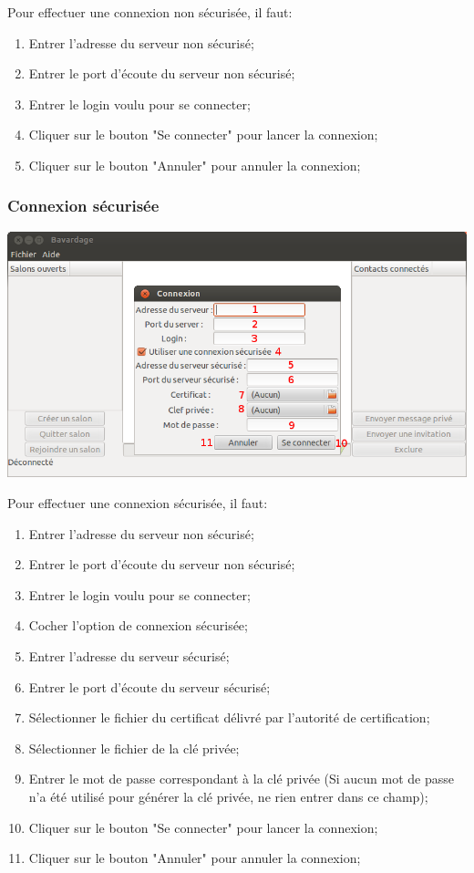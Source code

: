 \documentclass[a4paper,11pt,french]{book}
\begin{document}
Pour effectuer une connexion non sécurisée, il faut:
\begin{enumerate}
    \item Entrer l'adresse du serveur non sécurisé;
    \item Entrer le port d'écoute du serveur non sécurisé;
    \item Entrer le login voulu pour se connecter;
    \item Cliquer sur le bouton "Se connecter" pour lancer la connexion;
    \item Cliquer sur le bouton "Annuler" pour annuler la connexion;
\end{enumerate}
\subsubsection{Connexion sécurisée}

\includegraphics[width=45em]{capture/con_sec.png}

Pour effectuer une connexion sécurisée, il faut:

\begin{enumerate}
    \item Entrer l'adresse du serveur non sécurisé;
    \item Entrer le port d'écoute du serveur non sécurisé;
    \item Entrer le login voulu pour se connecter;
    \item Cocher l'option de connexion sécurisée;
    \item Entrer l'adresse du serveur sécurisé;
    \item Entrer le port d'écoute du serveur sécurisé;
    \item Sélectionner le fichier du certificat délivré par l'autorité de certification;
    \item Sélectionner le fichier de la clé privée;
    \item Entrer le mot de passe correspondant à la clé privée (Si aucun mot de passe n'a été utilisé pour générer la clé privée, ne rien entrer dans ce champ);
    \item Cliquer sur le bouton "Se connecter" pour lancer la connexion;
    \item Cliquer sur le bouton "Annuler" pour annuler la connexion;
\end{enumerate}
\end{document}
